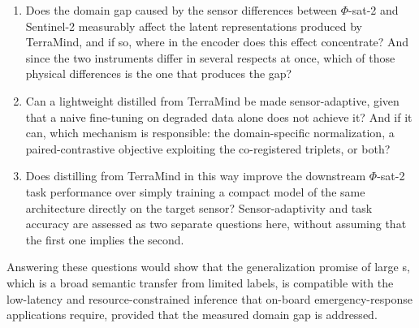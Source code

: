 \begin{enumerate}
    \item Does the domain gap caused by the sensor differences between $\Phi$-sat-2 and Sentinel-2 measurably affect the latent representations produced by TerraMind, and if so, where in the encoder does this effect concentrate? And since the two instruments differ in several respects at once, which of those physical differences is the one that produces the gap?
    \item Can a lightweight  distilled from TerraMind be made sensor-adaptive, given that a naive fine-tuning on degraded data alone does not achieve it? And if it can, which mechanism is responsible: the domain-specific normalization, a paired-contrastive objective exploiting the co-registered triplets, or both?
    \item Does distilling from TerraMind in this way improve the downstream $\Phi$-sat-2 task performance over simply training a compact model of the same architecture directly on the target sensor? Sensor-adaptivity and task accuracy are assessed as two separate questions here, without assuming that the first one implies the second.
\end{enumerate}

Answering these questions would show that the generalization promise of large s, which is a broad semantic transfer from limited labels, is compatible with the low-latency and resource-constrained inference that on-board emergency-response applications require, provided that the measured domain gap is addressed.
